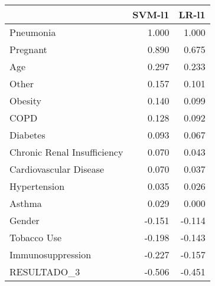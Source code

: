 \begin{tabular}{lrr}
\toprule
{} &  SVM-l1 &  LR-l1 \\
\midrule
Pneumonia                   &   1.000 &  1.000 \\
Pregnant                    &   0.890 &  0.675 \\
Age                         &   0.297 &  0.233 \\
Other                       &   0.157 &  0.101 \\
Obesity                     &   0.140 &  0.099 \\
COPD                        &   0.128 &  0.092 \\
Diabetes                    &   0.093 &  0.067 \\
Chronic Renal Insufficiency &   0.070 &  0.043 \\
Cardiovascular Disease      &   0.070 &  0.037 \\
Hypertension                &   0.035 &  0.026 \\
Asthma                      &   0.029 &  0.000 \\
Gender                      &  -0.151 & -0.114 \\
Tobacco Use                 &  -0.198 & -0.143 \\
Immunosuppression           &  -0.227 & -0.157 \\
RESULTADO\_3                 &  -0.506 & -0.451 \\
\bottomrule
\end{tabular}
